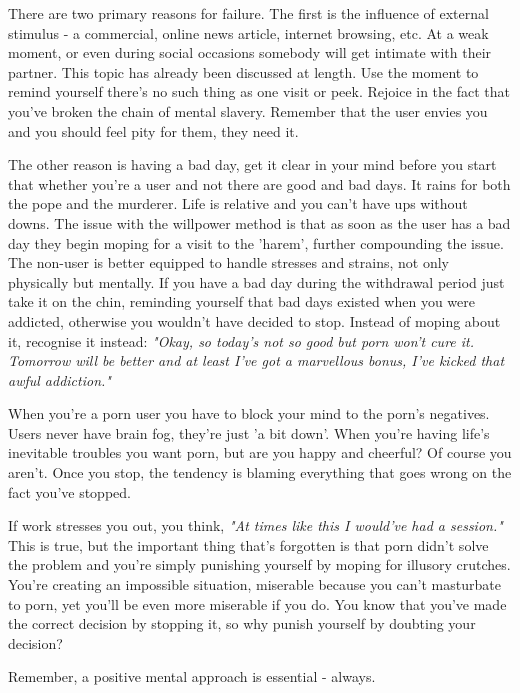 \documentclass[easypeasy.tex]{subfiles}
\begin{document}
There are two primary reasons for failure. The first is the influence of external stimulus - a commercial, online news article, internet browsing, etc. At a weak moment, or even during social occasions somebody will get intimate with their partner. This topic has already been discussed at length. Use the moment to remind yourself there's no such thing as one visit or peek. Rejoice in the fact that you've broken the chain of mental slavery. Remember that the user envies you and you should feel pity for them, they need it.

The other reason is having a bad day, get it clear in your mind before you start that whether you're a user and not there are good and bad days. It rains for both the pope and the murderer. Life is relative and you can't have ups without downs. The issue with the willpower method is that as soon as the user has a bad day they begin moping for a visit to the 'harem', further compounding the issue. The non-user is better equipped to handle stresses and strains, not only physically but mentally. If you have a bad day during the withdrawal period just take it on the chin, reminding yourself that bad days existed when you were addicted, otherwise you wouldn't have decided to stop. Instead of moping about it, recognise it instead: \textit{"Okay, so today's not so good but porn won't cure it. Tomorrow will be better and at least I've got a marvellous bonus, I've kicked that awful addiction."}

When you're a porn user you have to block your mind to the porn's negatives. Users never have brain fog, they're just 'a bit down'. When you're having life's inevitable troubles you want porn, but are you happy and cheerful? Of course you aren't. Once you stop, the tendency is blaming everything that goes wrong on the fact you've stopped.

If work stresses you out, you think, \textit{"At times like this I would've had a session."} This is true, but the important thing that's forgotten is that porn didn't solve the problem and you're simply punishing yourself by moping for illusory crutches. You're creating an impossible situation, miserable because you can't masturbate to porn, yet you'll be even more miserable if you do. You know that you've made the correct decision by stopping it, so why punish yourself by doubting your decision?

{\Large Remember, a positive mental approach is essential - always.}
\end{document}
